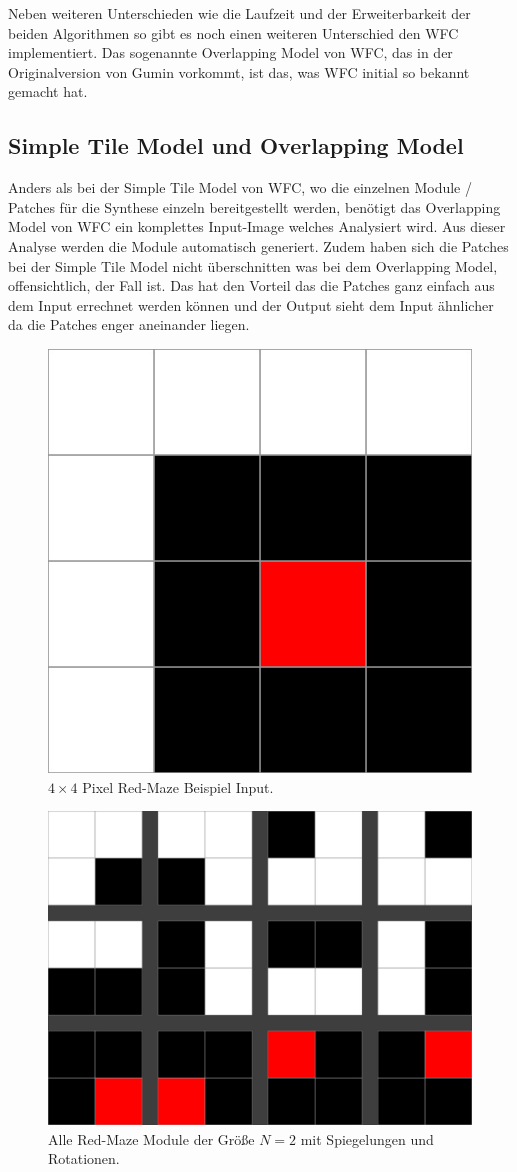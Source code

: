 \documentclass[12pt, a4paper,twoside,openright]{report}
\begin{document}
Neben weiteren Unterschieden wie die Laufzeit und der Erweiterbarkeit der beiden Algorithmen so gibt es noch einen weiteren Unterschied den WFC implementiert.
Das sogenannte Overlapping Model von WFC, das in der Originalversion von Gumin vorkommt, ist das, was WFC initial so bekannt gemacht hat.

\subsection{Simple Tile Model und Overlapping Model}

Anders als bei der Simple Tile Model von WFC, wo die einzelnen Module / Patches für die Synthese einzeln bereitgestellt werden,
benötigt das Overlapping Model von WFC ein komplettes Input-Image welches Analysiert wird.
Aus dieser Analyse werden die Module automatisch generiert.
Zudem haben sich die Patches bei der Simple Tile Model nicht überschnitten was bei dem Overlapping Model, offensichtlich, der Fall ist.
Das hat den Vorteil das die Patches ganz einfach aus dem Input errechnet werden können und der Output sieht dem Input ähnlicher da die Patches enger aneinander liegen. \cite{merrell2018compare}

\begin{figure}[H]
    \centering
    \includegraphics[width=0.5\linewidth]{images/red-maze.jpg}%
    \caption{$4\times 4$ Pixel Red-Maze Beispiel Input.}%
\end{figure}


\begin{figure}[H]
    \centering
    \includegraphics[width=0.5\linewidth]{images/red-maze-modules.jpg}%
    \caption{Alle Red-Maze Module der Größe $N = 2$ mit Spiegelungen und Rotationen.}%
\end{figure}
\end{document}
